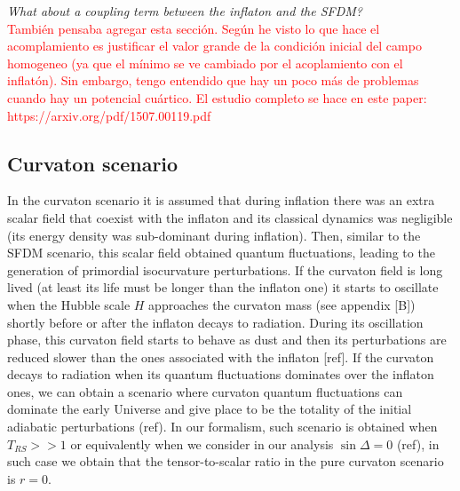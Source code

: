 \documentclass[twocolumn,           %
               showpacs,            %
               preprintnumbers,     %
               aps,                 %
               prl,          	    %
               letterpaper,             %
               superscriptaddress,      %
               nofootinbib,         %
               tightenlines,        %
               floats,floatfix      %
               ,usenatbib,
               ]{revtex4-1}
\begin{document}
\textit{What about a coupling term between the inflaton and the SFDM?}
\\

\textcolor{red}{Tambi\'en pensaba agregar esta secci\'on. Seg\'un he visto lo que hace el acomplamiento es justificar el valor grande de la condici\'on inicial del campo homogeneo (ya que el m\'inimo se ve cambiado por el acoplamiento con el inflat\'on). Sin embargo, tengo entendido que hay un poco m\'as de problemas cuando hay un potencial cu\'artico. El estudio completo se hace en este paper: https://arxiv.org/pdf/1507.00119.pdf }

\subsection{Curvaton scenario}

In the curvaton scenario it is assumed that during inflation there was an extra scalar field that coexist with the inflaton and its classical dynamics was negligible (its energy density was sub-dominant during inflation). Then, similar to the SFDM scenario, this scalar field obtained quantum fluctuations, leading to the generation of primordial isocurvature perturbations. If the curvaton field is long lived (at least its life must be longer than the inflaton one) it starts to oscillate when the Hubble scale $H$ approaches the curvaton mass (see appendix [B]) shortly before or after the inflaton decays to radiation. During its oscillation phase, this curvaton field starts to behave as dust and then its perturbations are reduced slower than the ones associated with the inflaton [ref]. If the curvaton decays to radiation when its quantum fluctuations dominates over the inflaton ones, we can obtain a scenario where curvaton quantum fluctuations can dominate the early Universe and give place to be the totality of the initial adiabatic perturbations (ref). In our formalism, such scenario is obtained when $T_{RS}>>1$ or equivalently when we consider in our analysis $\sin\Delta = 0$ (ref), in such case we obtain that the tensor-to-scalar ratio in the pure curvaton scenario is $r=0$. 
\end{document}
